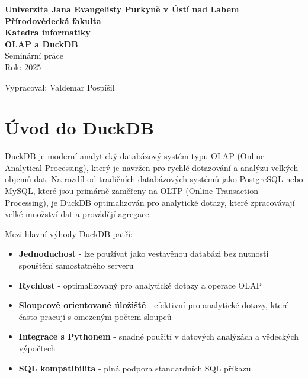 \documentclass[a4paper,12pt]{article}
\begin{document}
\begin{titlepage}
    \centering
    \vspace*{2cm}
    
    {\LARGE \textbf{Univerzita Jana Evangelisty Purkyně v Ústí nad Labem}}\\[0.5cm]
    {\Large \textbf{Přírodovědecká fakulta}}\\[0.5cm]
    {\Large \textbf{Katedra informatiky}}\\[3cm]

    {\Huge \textbf{OLAP a DuckDB}}\\[2cm]

    {\Large Seminární práce}\\[0.5cm]
    {\Large Rok: 2025}\\[3cm]

    \begin{flushright}
        {\Large Vypracoval: Valdemar Pospíšil}\\
    \end{flushright}
\end{titlepage}
\newpage

\tableofcontents
\newpage

\section{Úvod do DuckDB}
DuckDB je moderní analytický databázový systém typu OLAP (Online Analytical Processing), který je navržen pro rychlé dotazování a analýzu velkých objemů dat. Na rozdíl od tradičních databázových systémů jako PostgreSQL nebo MySQL, které jsou primárně zaměřeny na OLTP (Online Transaction Processing), je DuckDB optimalizován pro analytické dotazy, které zpracovávají velké množství dat a provádějí agregace.

Mezi hlavní výhody DuckDB patří:
\begin{itemize}
    \item \textbf{Jednoduchost} - lze používat jako vestavěnou databázi bez nutnosti spouštění samostatného serveru
    \item \textbf{Rychlost} - optimalizovaný pro analytické dotazy a operace OLAP
    \item \textbf{Sloupcově orientované úložiště} - efektivní pro analytické dotazy, které často pracují s omezeným počtem sloupců
    \item \textbf{Integrace s Pythonem} - snadné použití v datových analýzách a vědeckých výpočtech
    \item \textbf{SQL kompatibilita} - plná podpora standardních SQL příkazů
\end{itemize}
\end{document}
